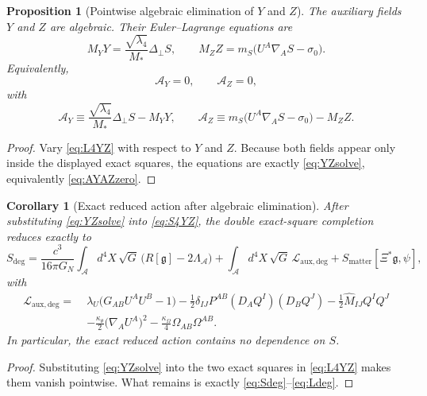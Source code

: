 \documentclass[11pt]{article}
\newcommand{\Sub}{\mathcal{A}}
\newcommand{\BridgeMetric}{\mathfrak{g}}
\newcommand{\AY}{\mathcal A_Y}
\newcommand{\AZ}{\mathcal A_Z}
\newtheorem{proposition}{Proposition}
\newtheorem{corollary}{Corollary}
\begin{document}
\begin{proposition}[Pointwise algebraic elimination of \(Y\) and \(Z\)]
\label{prop:YZsolve}
The auxiliary fields \(Y\) and \(Z\) are algebraic. Their Euler--Lagrange equations are
\begin{equation}
M_YY
=
\frac{\sqrt{\lambda_4}}{M_*}\Delta_\perp S,
\qquad
M_ZZ
=
m_S\bigl(U^A\nabla_A S-\sigma_0\bigr).
\label{eq:YZsolve}
\end{equation}
Equivalently,
\begin{equation}
\AY=0,
\qquad
\AZ=0,
\label{eq:AYAZzero}
\end{equation}
with
\begin{equation}
\AY
\equiv
\frac{\sqrt{\lambda_4}}{M_*}\Delta_\perp S-M_YY,
\qquad
\AZ
\equiv
m_S\bigl(U^A\nabla_A S-\sigma_0\bigr)-M_ZZ.
\label{eq:AYAZdef}
\end{equation}
\end{proposition}

\begin{proof}
Vary \eqref{eq:L4YZ} with respect to \(Y\) and \(Z\). Because both fields appear only inside the displayed exact squares, the equations are exactly \eqref{eq:YZsolve}, equivalently \eqref{eq:AYAZzero}.
\end{proof}

\begin{corollary}[Exact reduced action after algebraic elimination]
\label{cor:Sdeg}
After substituting \eqref{eq:YZsolve} into \eqref{eq:S4YZ}, the double exact-square completion reduces exactly to
\begin{equation}
S_{\mathrm{deg}}
=
\frac{c^3}{16\pi G_N}
\int_{\Sub} d^4X\,\sqrt{G}\,\bigl(R[\BridgeMetric]-2\Lambda_{\Sub}\bigr)
+\int_{\Sub} d^4X\,\sqrt{G}\,\mathcal L_{\mathrm{aux,deg}}
+S_{\mathrm{matter}}[\Xi^*\BridgeMetric,\psi],
\label{eq:Sdeg}
\end{equation}
with
\begin{align}
\mathcal L_{\mathrm{aux,deg}}
=\;&
\lambda_U\bigl(G_{AB}U^AU^B-1\bigr)
-\frac12\delta_{IJ}P^{AB}(D_AQ^I)(D_BQ^J)
-\frac12\widehat M_{IJ}Q^IQ^J
\nonumber\\
&-\frac{\kappa_\theta}{2}\bigl(\nabla_AU^A\bigr)^2
-\frac{\kappa_\Omega}{4}\Omega_{AB}\Omega^{AB}.
\label{eq:Ldeg}
\end{align}
In particular, the exact reduced action contains no dependence on \(S\).
\end{corollary}

\begin{proof}
Substituting \eqref{eq:YZsolve} into the two exact squares in \eqref{eq:L4YZ} makes them vanish pointwise. What remains is exactly \eqref{eq:Sdeg}--\eqref{eq:Ldeg}.
\end{proof}
\end{document}
